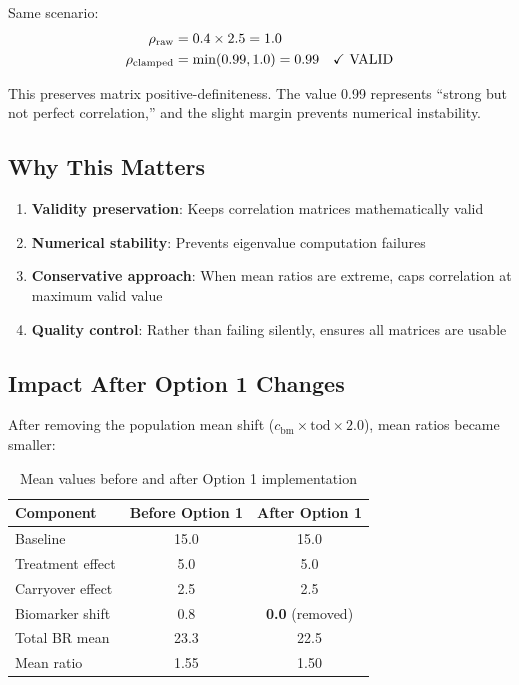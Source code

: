 \documentclass[11pt]{article}
\begin{document}
Same scenario:
\begin{align*}
\rho_{\text{raw}} &= 0.4 \times 2.5 = 1.0 \\
\rho_{\text{clamped}} &= \min(0.99, 1.0) = 0.99 \quad \text{\checkmark~VALID}
\end{align*}

This preserves matrix positive-definiteness. The value 0.99 represents ``strong but not perfect correlation,'' and the slight margin prevents numerical instability.

\subsection{Why This Matters}

\begin{enumerate}[label=\arabic*.]
    \item \textbf{Validity preservation}: Keeps correlation matrices mathematically valid
    \item \textbf{Numerical stability}: Prevents eigenvalue computation failures
    \item \textbf{Conservative approach}: When mean ratios are extreme, caps correlation at maximum valid value
    \item \textbf{Quality control}: Rather than failing silently, ensures all matrices are usable
\end{enumerate}

\subsection{Impact After Option 1 Changes}

After removing the population mean shift ($c_{\text{bm}} \times \text{tod} \times 2.0$), mean ratios became smaller:

\begin{table}[h]
\centering
\begin{tabular}{lcc}
\toprule
\textbf{Component} & \textbf{Before Option 1} & \textbf{After Option 1} \\
\midrule
Baseline & 15.0 & 15.0 \\
Treatment effect & 5.0 & 5.0 \\
Carryover effect & 2.5 & 2.5 \\
Biomarker shift & 0.8 & \textbf{0.0} (removed) \\
\midrule
Total BR mean & 23.3 & 22.5 \\
Mean ratio & 1.55 & 1.50 \\
\bottomrule
\end{tabular}
\caption{Mean values before and after Option 1 implementation}
\end{table}
\end{document}
